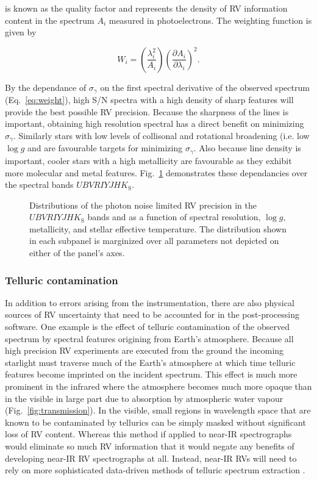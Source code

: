 \noindent is known as the quality factor and represents the density of RV information content
in the spectrum $A_i$ measured in photoelectrons. The weighting function is given by

\begin{equation}
  W_i = \left( \frac{\lambda_i^2}{A_i} \right) \left( \frac{\partial A_i}{\partial \lambda_i} \right)^2.
  \label{eq:weight}
\end{equation}

By the dependance of $\sigma_{\gamma}$ on the first spectral derivative of the observed spectrum
(Eq.~\ref{eq:weight}), high S/N spectra with a high density of sharp features will provide the
best possible RV precision. Because the sharpness of the lines is important, obtaining high
resolution spectral has a direct benefit on minimizing $\sigma_{\gamma}$. Similarly stars
with low levels of collisonal and rotational broadening (i.e. low $\log{g}$ and \vsini{)} are
favourable targets for minimizing $\sigma_{\gamma}$. Also because line density is important, cooler stars
with a high metallicity are favourable as they exhibit more molecular and metal features.
Fig.~\ref{fig:sigrv} demonstrates these dependancies over the spectral
bands $UBVRIYJHK_{\text{S}}$.

\begin{figure}
  \centering
  \caption{Distributions of the photon noise limited RV precision in the $UBVRIYJHK_{\text{S}}$
    bands and as a function of spectral resolution, $\log{g}$, metallicity, \vsini{,}
    and stellar effective temperature. The distribution shown in each subpanel is marginized
    over all parameters not depicted on either of the panel's axes.}
  \label{fig:sigrv}
\end{figure}

\subsubsection{Telluric contamination}
In addition to errors arising from the instrumentation, there are also physical sources of RV
uncertainty that need to be accounted for in the post-processing software. One example is the effect
of telluric contamination of the observed spectrum by spectral features origining from Earth's
atmosphere. Because all high precision RV experiments are executed from the ground the incoming
starlight must traverse much of the Earth's atmosphere at which time telluric features become
imprinted on the incident spectrum. This effect is much more prominent in the infrared where
the atmosphere becomes much more opaque than in the visible in large part due to absorption by
atmospheric water vapour (Fig.~\ref{fig:transmission}). In the visible, small regions
in wavelength space that are known to be contaminated by tellurics can be simply masked without
significant loss of RV content. Whereas this method if applied to near-IR spectrographs would
eliminate so much RV information that it would negate any benefits of developing near-IR RV
spectrographs at all. Instead, near-IR RVs will need to rely on more sophisticated data-driven
methods of telluric spectrum extraction \citep[e.g.][]{artigau14,bedell19}.

